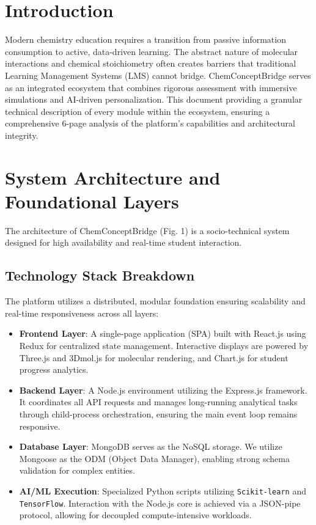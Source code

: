 \documentclass[10pt, conference]{IEEEtran}
\begin{document}
\section{Introduction}
Modern chemistry education requires a transition from passive information consumption to active, data-driven learning. The abstract nature of molecular interactions and chemical stoichiometry often creates barriers that traditional Learning Management Systems (LMS) cannot bridge. ChemConceptBridge serves as an integrated ecosystem that combines rigorous assessment with immersive simulations and AI-driven personalization. This document providing a granular technical description of every module within the ecosystem, ensuring a comprehensive 6-page analysis of the platform's capabilities and architectural integrity.

\section{System Architecture and Foundational Layers}
The architecture of ChemConceptBridge (Fig. 1) is a socio-technical system designed for high availability and real-time student interaction.

\subsection{Technology Stack Breakdown}
The platform utilizes a distributed, modular foundation ensuring scalability and real-time responsiveness across all layers:
\begin{itemize}
    \item \textbf{Frontend Layer}: A single-page application (SPA) built with React.js using Redux for centralized state management. Interactive displays are powered by Three.js and 3Dmol.js for molecular rendering, and Chart.js for student progress analytics.
    \item \textbf{Backend Layer}: A Node.js environment utilizing the Express.js framework. It coordinates all API requests and manages long-running analytical tasks through child-process orchestration, ensuring the main event loop remains responsive.
    \item \textbf{Database Layer}: MongoDB serves as the NoSQL storage. We utilize Mongoose as the ODM (Object Data Manager), enabling strong schema validation for complex entities.
    \item \textbf{AI/ML Execution}: Specialized Python scripts utilizing \texttt{Scikit-learn} and \texttt{TensorFlow}. Interaction with the Node.js core is achieved via a JSON-pipe protocol, allowing for decoupled compute-intensive workloads.
\end{itemize}
\end{document}
